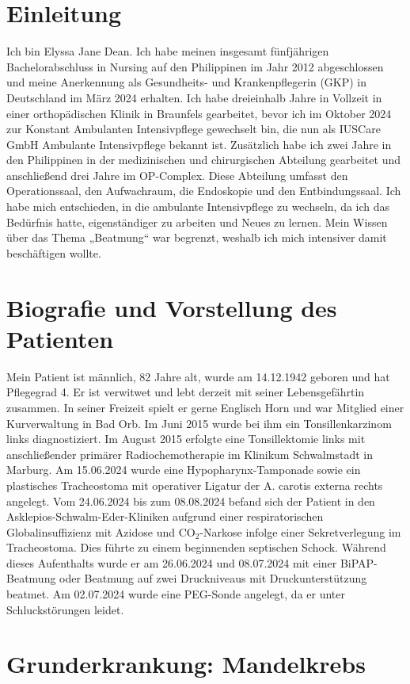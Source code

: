 \documentclass[a4paper,12pt]{article}
\newcommand{\autor}{Elyssa Jane Dean}
\begin{document}
\section{Einleitung}
Ich bin \autor. Ich habe meinen insgesamt fünfjährigen
Bachelorabschluss in Nursing auf den Philippinen im Jahr 2012 abgeschlossen
und meine Anerkennung als Gesundheits- und Krankenpflegerin (GKP) in
Deutschland im März 2024 erhalten.
Ich habe dreieinhalb Jahre in Vollzeit in einer orthopädischen Klinik in
Braunfels gearbeitet, bevor ich im Oktober 2024 zur Konstant Ambulanten
Intensivpflege gewechselt bin, die nun als IUSCare GmbH Ambulante Intensivpflege bekannt ist.
Zusätzlich habe ich zwei Jahre in den Philippinen in der medizinischen und
chirurgischen Abteilung gearbeitet und anschließend drei Jahre im OP-Complex.
Diese Abteilung umfasst den Operationssaal, den Aufwachraum, die Endoskopie
und den Entbindungssaal.
Ich habe mich entschieden, in die ambulante Intensivpflege zu wechseln, da ich
das Bedürfnis hatte, eigenständiger zu arbeiten und Neues zu lernen. Mein
Wissen über das Thema „Beatmung“ war begrenzt, weshalb ich mich intensiver
damit beschäftigen wollte.

\section{Biografie und Vorstellung des Patienten}
Mein Patient ist männlich, 82 Jahre alt, wurde am 14.12.1942 geboren
und hat Pflegegrad 4. Er ist verwitwet und
lebt derzeit mit seiner Lebensgefährtin zusammen.
In seiner Freizeit spielt er gerne Englisch Horn
und war Mitglied einer Kurverwaltung in Bad Orb.
Im Juni 2015 wurde bei ihm ein Tonsillenkarzinom links diagnostiziert. Im
August 2015 erfolgte eine Tonsillektomie links mit anschließender primärer
Radiochemotherapie im Klinikum Schwalmstadt in Marburg.
Am 15.06.2024 wurde eine Hypopharynx-Tamponade sowie ein plastisches
Tracheostoma mit operativer Ligatur der A. carotis externa rechts angelegt.
Vom 24.06.2024 bis zum 08.08.2024 befand sich der Patient in den
Asklepios-Schwalm-Eder-Kliniken aufgrund einer respiratorischen
Globalinsuffizienz mit Azidose und CO$_2$-Narkose infolge einer
Sekretverlegung im Tracheostoma. Dies führte zu einem beginnenden septischen
Schock. Während dieses Aufenthalts wurde er am 26.06.2024 und 08.07.2024 mit
einer BiPAP-Beatmung oder Beatmung auf zwei Druckniveaus mit Druckunterstützung beatmet.
Am 02.07.2024 wurde eine PEG-Sonde angelegt, da er unter Schluckstörungen leidet.

\section{Grunderkrankung: Mandelkrebs}
\end{document}
